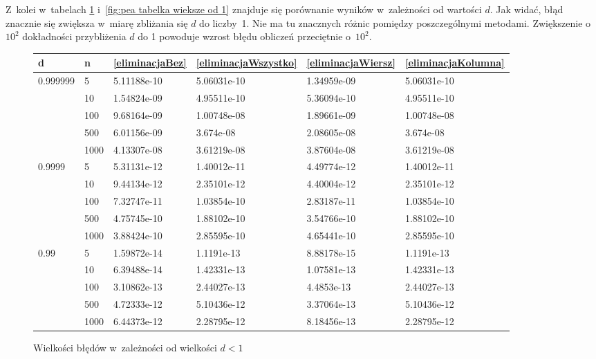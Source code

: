 \documentclass[a4paper]{article}
\begin{document}
Z~kolei w~tabelach \ref{fig:pea tabelka mniejsze od 1} i~\ref{fig:pea tabelka wieksze od 1} znajduje się porównanie wyników w~zależności od wartości $d$. Jak widać,
błąd znacznie się zwiększa w~miarę zbliżania się $d$ do liczby~1. Nie ma tu znacznych różnic pomiędzy poszczególnymi metodami. Zwiększenie o~$10^2$ dokładności przybliżenia $d$ do 1 powoduje wzrost błędu obliczeń przeciętnie o~$10^2$. 

\begin{figure}[H]
\centering
\begin{tabular}{l||l|l|l|l|l}
 d	&	n	&	\ref{eliminacjaBez}	&	\ref{eliminacjaWszystko}	&	\ref{eliminacjaWiersz}	&	\ref{eliminacjaKolumna}	\\ \hline \hline
\multirow{5}{*}{0.999999}&	5	&		5.11188e-10	&		5.06031e-10	&		1.34959e-09	&		5.06031e-10\\ \cline{2-6}  
	&	10	&		1.54824e-09	&		4.95511e-10	&		5.36094e-10	&		4.95511e-10\\ \cline{2-6}  
	&	100	&		9.68164e-09	&		1.00748e-08	&		1.89661e-09	&		1.00748e-08\\ \cline{2-6}  
	&	500	&		6.01156e-09	&		3.674e-08	&		2.08605e-08	&		3.674e-08\\ \cline{2-6}  
	&	1000	&		4.13307e-08	&		3.61219e-08	&		3.87604e-08	&		3.61219e-08\\ \hline \hline

\multirow{5}{*}{0.9999}&	5	&		5.31131e-12	&		1.40012e-11	&		4.49774e-12	&		1.40012e-11\\ \cline{2-6}  
	&	10	&		9.44134e-12	&		2.35101e-12	&		4.40004e-12	&		2.35101e-12\\ \cline{2-6}  
	&	100	&		7.32747e-11	&		1.03854e-10	&		2.83187e-11	&		1.03854e-10\\ \cline{2-6}  
	&	500	&		4.75745e-10	&		1.88102e-10	&		3.54766e-10	&		1.88102e-10\\ \cline{2-6}  
	&	1000	&		3.88424e-10	&		2.85595e-10	&		4.65441e-10	&		2.85595e-10\\ \hline \hline  

\multirow{5}{*}{0.99}	&	5	&		1.59872e-14	&		1.1191e-13	&		8.88178e-15	&		1.1191e-13\\ \cline{2-6}  
	&	10	&		6.39488e-14	&		1.42331e-13	&		1.07581e-13	&		1.42331e-13\\ \cline{2-6}  
	&	100	&		3.10862e-13	&		2.44027e-13	&		4.4853e-13	&		2.44027e-13\\ \cline{2-6}  
	&	500	&		4.72333e-12	&		5.10436e-12	&		3.37064e-13	&		5.10436e-12\\ \cline{2-6}  
	&	1000	&		6.44373e-12	&		2.28795e-12	&		8.18456e-13	&		2.28795e-12\\ \hline
\end{tabular}
\caption{Wielkości błędów w~zależności od wielkości $d<1$}
\label{fig:pea tabelka mniejsze od 1}
\end{figure}
\end{document}
